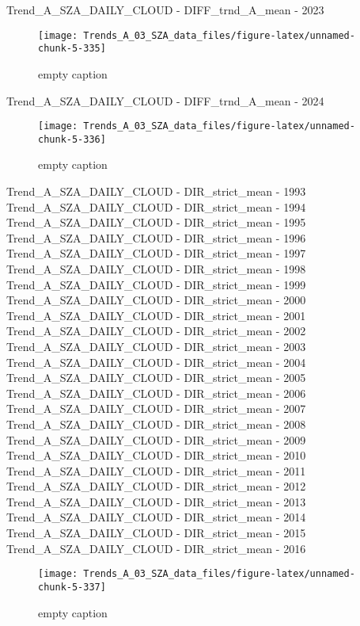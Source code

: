 \documentclass[
  10pt,
  a4paper,oneside]{article}
\begin{document}
Trend\_A\_SZA\_DAILY\_CLOUD - DIFF\_trnd\_A\_mean - 2023

\begin{figure}[!ht]

{\centering \texttt{[image: Trends\_A\_03\_SZA\_data\_files/figure-latex/unnamed-chunk-5-335]} 

}

\caption{ empty caption }\label{fig:unnamed-chunk-5-335}
\end{figure}

Trend\_A\_SZA\_DAILY\_CLOUD - DIFF\_trnd\_A\_mean - 2024

\begin{figure}[!ht]

{\centering \texttt{[image: Trends\_A\_03\_SZA\_data\_files/figure-latex/unnamed-chunk-5-336]} 

}

\caption{ empty caption }\label{fig:unnamed-chunk-5-336}
\end{figure}

Trend\_A\_SZA\_DAILY\_CLOUD - DIR\_strict\_mean - 1993
Trend\_A\_SZA\_DAILY\_CLOUD - DIR\_strict\_mean - 1994
Trend\_A\_SZA\_DAILY\_CLOUD - DIR\_strict\_mean - 1995
Trend\_A\_SZA\_DAILY\_CLOUD - DIR\_strict\_mean - 1996
Trend\_A\_SZA\_DAILY\_CLOUD - DIR\_strict\_mean - 1997
Trend\_A\_SZA\_DAILY\_CLOUD - DIR\_strict\_mean - 1998
Trend\_A\_SZA\_DAILY\_CLOUD - DIR\_strict\_mean - 1999
Trend\_A\_SZA\_DAILY\_CLOUD - DIR\_strict\_mean - 2000
Trend\_A\_SZA\_DAILY\_CLOUD - DIR\_strict\_mean - 2001
Trend\_A\_SZA\_DAILY\_CLOUD - DIR\_strict\_mean - 2002
Trend\_A\_SZA\_DAILY\_CLOUD - DIR\_strict\_mean - 2003
Trend\_A\_SZA\_DAILY\_CLOUD - DIR\_strict\_mean - 2004
Trend\_A\_SZA\_DAILY\_CLOUD - DIR\_strict\_mean - 2005
Trend\_A\_SZA\_DAILY\_CLOUD - DIR\_strict\_mean - 2006
Trend\_A\_SZA\_DAILY\_CLOUD - DIR\_strict\_mean - 2007
Trend\_A\_SZA\_DAILY\_CLOUD - DIR\_strict\_mean - 2008
Trend\_A\_SZA\_DAILY\_CLOUD - DIR\_strict\_mean - 2009
Trend\_A\_SZA\_DAILY\_CLOUD - DIR\_strict\_mean - 2010
Trend\_A\_SZA\_DAILY\_CLOUD - DIR\_strict\_mean - 2011
Trend\_A\_SZA\_DAILY\_CLOUD - DIR\_strict\_mean - 2012
Trend\_A\_SZA\_DAILY\_CLOUD - DIR\_strict\_mean - 2013
Trend\_A\_SZA\_DAILY\_CLOUD - DIR\_strict\_mean - 2014
Trend\_A\_SZA\_DAILY\_CLOUD - DIR\_strict\_mean - 2015
Trend\_A\_SZA\_DAILY\_CLOUD - DIR\_strict\_mean - 2016

\begin{figure}[!ht]

{\centering \texttt{[image: Trends\_A\_03\_SZA\_data\_files/figure-latex/unnamed-chunk-5-337]} 

}

\caption{ empty caption }\label{fig:unnamed-chunk-5-337}
\end{figure}
\end{document}
